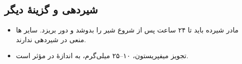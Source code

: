 \documentclass[12pt,a4paper]{article}
\begin{document}
\subsection*{شیردهی و گزینهٔ دیگر}
\begin{itemize}
  \item مادر شیرده باید تا ۲۴ ساعت پس از شروع  شیر را بدوشد و دور بریزد. سایر ها منعی در شیردهی ندارند.
  \item تجویز میفپریستون، ۱۰–۲۵ میلی‌گرم، به اندازهٔ  در  مؤثر است.
\end{itemize}

\ECfinish
\end{document}
